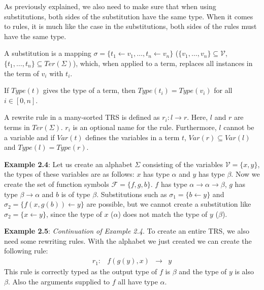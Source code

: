 As previously explained, we also need to make sure that when using substitutions, both sides of the substitution have the same type. When it comes to rules, it is much like the case in the substitutions, both sides of the rules must have the same type.
\begin{definition}
A substitution is a mapping $\sigma = \{ t_1 \leftarrow v_1, \dots, t_n \leftarrow v_n \}$ ($\{ v_1, \dots, v_n \} \subseteq \mathcal{V}$, $\{ t_1, \dots, t_n\} \subseteq \textit{Ter}(\Sigma)$), which, when applied to a term, replaces all instances in the term of $v_i$ with $t_i$.  

If $\textit{Type}(t)$ gives the type of a term, then $\textit{Type}(t_i) = \textit{Type}(v_i)$ for all $i \in [ 0, n ]$.
\end{definition}

\begin{definition}
A rewrite rule in a many-sorted TRS is defined as $r_i : l \rightarrow r$. Here, $l$ and $r$ are terms in $\textit{Ter}(\Sigma)$. $r_i$ is an optional name for the rule. Furthermore, $l$ cannot be a variable and if $\textit{Var}(t)$ defines the variables in a term $t$, $\textit{Var}(r) \subseteq \textit{Var}(l)$ and \textbf{$\textit{Type}(l) = \textit{Type}(r)$}. 
\end{definition}

\textbf{Example 2.4}: Let us create an alphabet $\Sigma$ consisting of the variables $\mathcal{V} = \{ x, y\}$, the types of these variables are as follows: $x$ has type $\alpha$ and $y$ has type $\beta$. Now we create the set of function symbols $\mathcal{F} = \{ f, g, b \}$. $f$ has type $\alpha \rightarrow \alpha \rightarrow \beta$, $g$ has type $\beta \rightarrow \alpha$ and $b$ is of type $\beta$. Substitutions such as $\sigma_1 = \{ b \leftarrow y \}$ and $\sigma_2 = \{ f(x, g(b)) \leftarrow y \}$ are possible, but we cannot create a substitution like $\sigma_2 = \{ x \leftarrow y \}$, since the type of $x$ ($\alpha$) does not match the type of $y$ ($\beta$).

\textbf{Example 2.5}: \textit{Continuation of Example 2.4}. To create an entire TRS, we also need some rewriting rules. With the alphabet we just created we can create the following rule: 
$$
\begin{array}{lrcl}
    r_1: & f(g(y), x) & \rightarrow & y
\end{array}
$$
This rule is correctly typed as the output type of $f$ is $\beta$ and the type of $y$ is also $\beta$. Also the arguments supplied to $f$ all have type $\alpha$. 


